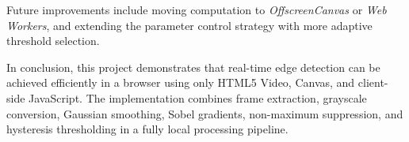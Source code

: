 Future improvements include moving computation to \emph{OffscreenCanvas} or \emph{Web Workers}, and extending the parameter control strategy with more adaptive threshold selection.

In conclusion, this project demonstrates that real-time edge detection can be achieved efficiently in a browser using only HTML5 Video, Canvas, and client-side JavaScript. The implementation combines frame extraction, grayscale conversion, Gaussian smoothing, Sobel gradients, non-maximum suppression, and hysteresis thresholding in a fully local processing pipeline.